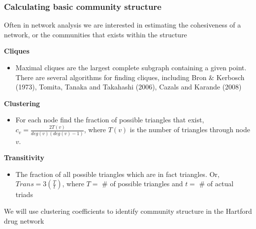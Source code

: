 \documentclass[xcolor=dvipsnames, 9pt]{beamer}
\begin{document}
\begin{frame}[fragile]
    \frametitle{Calculating basic community structure}
    Often in network analysis we are interested in estimating the cohesiveness of a network, or the communities that exists within the structure
    \vspace{3mm}
    
    \textbf{Cliques}
    \begin{itemize}
        \item Maximal cliques are the largest complete subgraph containing a given point.  There are several algorithms for finding cliques, including Bron & Kerbosch (1973), Tomita, Tanaka and Takahashi (2006), Cazals and Karande (2008)
    \end{itemize}
    \textbf{Clustering}
    \begin{itemize}
        \item For each node find the fraction of possible triangles that exist,$c_{v}=\frac{2T(v)}{deg(v)(deg(v)-1)}$, where $T(v)$ is the number of triangles through node $v$.
    \end{itemize}
    \textbf{Transitivity}
    \begin{itemize}
        \item The fraction of all possible triangles which are in fact triangles. Or, $Trans=3\left(\frac{T}{t}\right)$, where $T=$ \# of possible triangles and $t=$ \# of actual triads
    \end{itemize}
    We will use clustering coefficients to identify community structure in the Hartford drug network
\end{frame}
\end{document}
